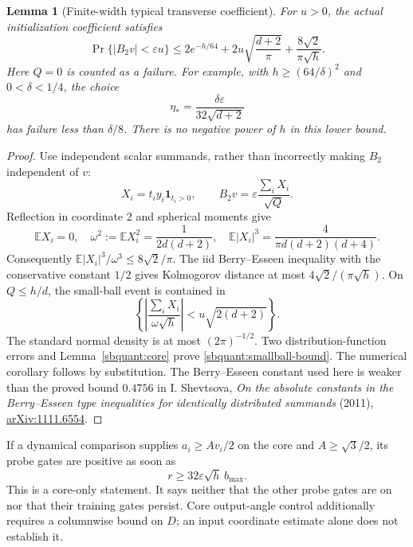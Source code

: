 \documentclass[11pt]{article}
\newtheorem{lemma}[theorem]{Lemma}
\theoremstyle{remark}
\begin{document}
\begin{lemma}[Finite-width typical transverse coefficient]
\label{sbquant:smallball}
For $u>0$, the actual initialization coefficient satisfies
\begin{equation}\label{sbquant:smallball-bound}
 \Pr\{|B_2v|<\varepsilon u\}
 \le 2e^{-h/64}
 +2u\sqrt{\frac{d+2}{\pi}}
 +\frac{8\sqrt2}{\pi\sqrt h}.
\end{equation}
Here $Q=0$ is counted as a failure. For example, with
$h\ge(64/\delta)^2$ and $0<\delta<1/4$, the choice
\[
 \eta_* =\frac{\delta\varepsilon}{32\sqrt{d+2}}
\]
has failure less than $\delta/8$. There is no negative power of $h$ in
this lower bound.
\end{lemma}
\begin{proof}
Use independent scalar summands, rather than incorrectly making $B_2$
independent of $v$:
\[
 X_i=t_i y_i\mathbf1_{t_i>0},\qquad
 B_2v=\varepsilon\frac{\sum_iX_i}{\sqrt Q}.
\]
Reflection in coordinate 2 and spherical moments give
\[
 \mathbb EX_i=0,\quad
 \omega^2:=\mathbb EX_i^2=\frac1{2d(d+2)},\quad
 \mathbb E|X_i|^3=\frac4{\pi d(d+2)(d+4)}.
\]
Consequently $\mathbb E|X_i|^3/\omega^3\le8\sqrt2/\pi$.
The iid Berry--Esseen inequality with the conservative constant $1/2$
gives Kolmogorov distance at most $4\sqrt2/(\pi\sqrt h)$.
On $Q\le h/d$, the small-ball event is contained in
\[
 \left\{\left|\frac{\sum_iX_i}{\omega\sqrt h}\right|
 <u\sqrt{2(d+2)}\right\}.
\]
The standard normal density is at most $(2\pi)^{-1/2}$.
Two distribution-function errors and Lemma~\ref{sbquant:core} prove
\eqref{sbquant:smallball-bound}. The numerical corollary follows by
substitution. The Berry--Esseen constant used here is weaker than the
proved bound $0.4756$ in I. Shevtsova,
\emph{On the absolute constants in the Berry--Esseen type inequalities
for identically distributed summands} (2011),
\href{https://arxiv.org/abs/1111.6554}{arXiv:1111.6554}.
\end{proof}

If a dynamical comparison supplies $a_i\ge Av_i/2$ on the core and
$A\ge\sqrt3/2$, its probe gates are positive as soon as
\begin{equation}\label{sbquant:core-radius}
 r\ge32\varepsilon\sqrt h\,b_{\max}.
\end{equation}
This is a core-only statement. It says neither that the other probe
gates are on nor that their training gates persist. Core output-angle
control additionally requires a columnwise bound on $D$; an input
coordinate estimate alone does not establish it.
\end{document}
